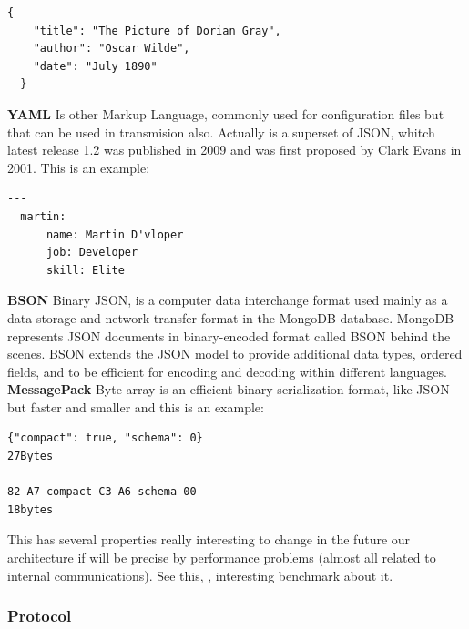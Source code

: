 \begin{lstlisting}[frame=none,numbers=none]
  {
    "title": "The Picture of Dorian Gray",
    "author": "Oscar Wilde",
    "date": "July 1890"
  }
\end{lstlisting}


\noindent \textbf{YAML}
\intro
Is other Markup Language, commonly used for configuration files but that can
be used in transmision also. Actually is a superset of JSON, whitch latest release
1.2 was published in 2009 and was first proposed by Clark Evans in 2001.
This is an example:

\begin{lstlisting}[frame=none,numbers=none]
  ---
  martin:
      name: Martin D'vloper
      job: Developer
      skill: Elite
\end{lstlisting}


\noindent \textbf{BSON}
\intro
Binary JSON, is a computer data interchange format used mainly as a data storage
and network transfer format in the MongoDB database.
MongoDB represents JSON documents in binary-encoded format called BSON behind
the scenes. BSON extends the JSON model to provide additional data types,
ordered fields, and to be efficient for encoding and decoding within different languages.
\intro
\noindent \textbf{MessagePack}
\intro
Byte array is an efficient binary serialization format, like JSON but faster and smaller and this is an example:

\begin{lstlisting}[frame=none,numbers=none]
{"compact": true, "schema": 0}
27Bytes

82 A7 compact C3 A6 schema 00
18bytes
\end{lstlisting}

\noindent This has several properties really interesting to change in the future
our architecture if will be precise by performance problems (almost all related to internal communications).
See this, \cite{comparision}, interesting benchmark about it.

\subsubsection{Protocol}

